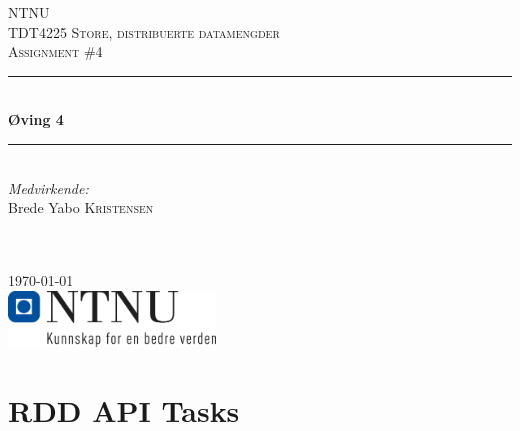 \documentclass[12pt]{article}
\begin{document}
\begin{titlepage}

\newcommand{\HRule}{\rule{\linewidth}{0.5mm}} %

\center %
 

\textsc{\LARGE NTNU}\\[1.5cm] %
\textsc{\Large TDT4225 Store, distribuerte datamengder}\\[0.5cm] %
\textsc{\large Assignment \#4}\\[0.5cm] %

\HRule \\[0.4cm]
{ \huge \bfseries Øving 4}\\[0.4cm] %
\HRule \\[1.5cm]
 

\emph{Medvirkende:}\\
Brede Yabo \textsc{Kristensen}\\ %

~

\emph{} \\


{\large \today}\\[2cm] %

\includegraphics[width=55mm,scale=1.0]{logo_ntnu_bokm.png}\\[1cm] %
 
\title{}
\vfill %


\end{titlepage}

\section{RDD API Tasks}
\end{document}
